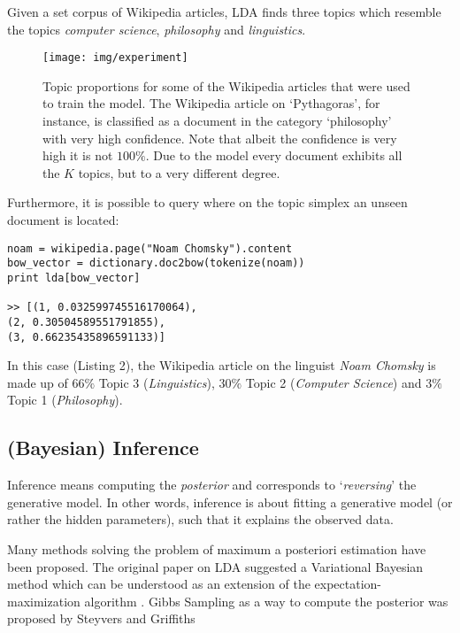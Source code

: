 \documentclass[a4paper,ngerman, english]{atseminar}
\begin{document}
\noindent
Given a set corpus of Wikipedia articles, LDA finds three topics which resemble the topics \textit{computer science},
\textit{philosophy} and \textit{linguistics}. 


\begin{figure}
\centering
\texttt{[image: img/experiment]}
 \caption{Topic proportions for some of the Wikipedia articles that were used to train the model. The Wikipedia
 article on `Pythagoras', for instance, is classified as a document in the category `philosophy' with very high confidence.
 Note that albeit the confidence is very high it is not $100\%$. Due to the model every document exhibits all the $K$ topics, but to a very different degree.}
   \label{fig:experiments}
\end{figure}

\noindent
Furthermore, it is possible to query where on the topic simplex an unseen document is located:

\begin{lstlisting}[label=noam,caption=\; Query for a document]
noam = wikipedia.page("Noam Chomsky").content
bow_vector = dictionary.doc2bow(tokenize(noam))
print lda[bow_vector]

>> [(1, 0.032599745516170064), 
(2, 0.30504589551791855),
(3, 0.66235435896591133)]
\end{lstlisting}


In this case (Listing 2), the Wikipedia article on the linguist \textit{Noam Chomsky} is made up of
$66\%$ Topic 3 (\textit{Linguistics}), $30\%$ Topic 2 (\textit{Computer Science}) and
$3\%$ Topic 1 (\textit{Philosophy}).





\subsection{(Bayesian) Inference}

Inference means computing the \textit{posterior} and corresponds to `\textit{reversing}' the generative model.
In other words, inference is about fitting a generative model (or rather the hidden parameters), such that it explains the observed data.

Many methods solving the problem of maximum a posteriori estimation have been proposed. The original paper on LDA \cite{blei2003latent} suggested a Variational Bayesian method which can be understood as an extension of the expectation-maximization algorithm \cite{fox2012tutorial}. Gibbs Sampling as a way to compute the
posterior was proposed by Steyvers and Griffiths \cite{steyvers2007probabilistic}	 \\
\end{document}
